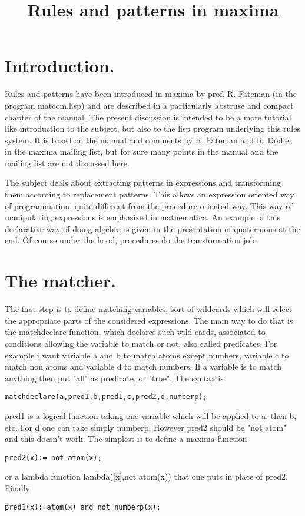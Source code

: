 \documentclass[a4paper,11pt]{article}
\title{Rules and patterns in maxima}
\begin{document}
\maketitle
\section{Introduction.}


Rules and patterns have been introduced in maxima by prof. R. Fateman
(in the program matcom.lisp) and are described in a particularly
abstruse and compact chapter of the manual. The present discussion is
intended to be a more tutorial like introduction to the subject, but
also to the lisp program underlying this rules system. It is based on
the manual and comments by R. Fateman and R. Dodier in the maxima
mailing list, but for sure many points in the manual and the mailing
list are not discussed here.

The subject deals about extracting patterns in expressions and
transforming them according to replacement patterns.  This allows an
expression oriented way of programmation, quite different from the
procedure oriented way. This way of manipulating expressions is
emphasized in mathematica. An example of this declarative way of doing
algebra is given in the presentation of quaternions at the end.  Of
course under the hood, procedures do the transformation job.

\section{The matcher.}

The first step is to define matching variables, sort of wildcards
which will select the appropriate parts of the considered
expressions. The main way to do that is the matchdeclare function,
which declares such wild cards, associated to conditions allowing the
variable to match or not, also called predicates. For example i want
variable a and b to match atoms except numbers, variable c to match non
atoms and variable d to match numbers.  If a variable is to match
anything then put "all" as predicate, or "true". The syntax is
\begin{verbatim}
matchdeclare(a,pred1,b,pred1,c,pred2,d,numberp);
\end{verbatim}
pred1 is a logical function taking one variable which will be applied
to a, then b, etc. For d  one can take simply numberp. However pred2 should
be "not atom" and this doesn't work. The simplest is to define a
maxima function 
\begin{verbatim}
pred2(x):= not atom(x);
\end{verbatim}
or a lambda function 
lambda([x],not atom(x)) that one puts in place of pred2. Finally
\begin{verbatim}
pred1(x):=atom(x) and not numberp(x);
\end{verbatim}
\end{document}
